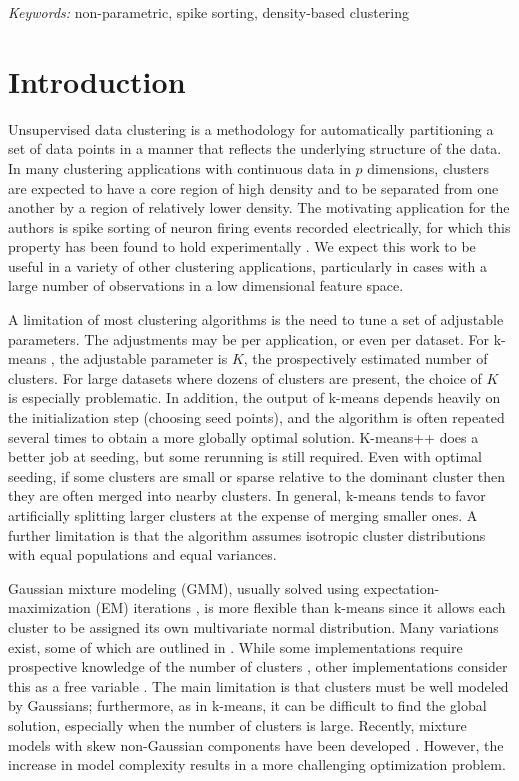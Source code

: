 \documentclass[10pt]{article}
\begin{document}
\noindent%
{\it Keywords:}  non-parametric, spike sorting, density-based clustering
\vfill

\newpage
{} %

\section {Introduction}

Unsupervised data clustering is a methodology for automatically partitioning a set of data points in a manner that reflects the underlying structure of the data. In many clustering applications with continuous data in $p$ dimensions, clusters are expected to have a core region of high density and to be separated from one another by a region of relatively lower density. The motivating application for the authors is spike sorting of neuron firing events recorded electrically, for which this property has been found to hold experimentally \citep{tiganj,vargas}. We expect this work to be useful in a variety of other clustering applications, particularly in cases with a large number of observations in a low dimensional feature space.

A limitation of most clustering algorithms is the need to tune a set of adjustable parameters. The adjustments may be per application, or even per dataset. For k-means \citep{kmeans}, the adjustable parameter is $K$, the prospectively estimated number of clusters. For large datasets where dozens of clusters are present, the choice of $K$ is especially problematic. In addition, the output of k-means depends heavily on the initialization step (choosing seed points), and the algorithm is often repeated several times to obtain a more globally optimal solution. K-means++ \citep{kmeanspp} does a better job at seeding, but some rerunning is still required. Even with optimal seeding, if some clusters are small or sparse relative to the dominant cluster then they are often merged into nearby clusters. In general, k-means tends to favor artificially splitting larger clusters at the expense of merging smaller ones. A further limitation is that the algorithm assumes isotropic cluster distributions with equal populations and equal variances.

Gaussian mixture modeling (GMM), usually solved using expectation-maximization (EM) iterations \citep{em}, is more flexible than k-means since it allows each cluster to be assigned its own multivariate normal distribution. Many variations exist, some of which are outlined in \citep[Ch.~11]{murphy}. While some implementations require prospective knowledge of the number of clusters \citep[Ch.~8]{mixturemodels}, other implementations consider this as a free variable \citep[e.g.][]{roberts1998bayesian}. 
The main limitation is that clusters must be well modeled by Gaussians; furthermore, as in k-means, it can be difficult to find the global solution, especially when the number of clusters is large.
Recently, mixture models with skew non-Gaussian
components have been developed \citep[e.g.][]{skewGMM,skewGMM2}. However, the increase in model complexity
results in a more challenging optimization problem.
\end{document}
